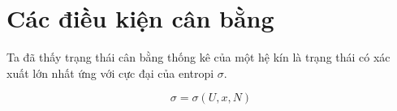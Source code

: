 \chapter{Các điều kiện cân bằng}
	Ta đã thấy trạng thái cân bằng thống kê của một hệ kín là trạng thái có xác xuất lớn nhất ứng với cực đại của entropi $ \sigma $.
	
	\begin{equation}
		\sigma = \sigma\left(U,x,N\right)
	\end{equation}

	
%	